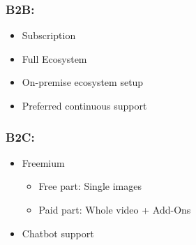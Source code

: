 \subsubsection*{B2B:}
\begin{itemize}
    \item Subscription
    \item Full Ecosystem
    \item On-premise ecosystem setup
    \item Preferred continuous support
\end{itemize}

\subsubsection*{B2C:}
\begin{itemize}
    \item Freemium
    \begin{itemize}
        \item Free part: Single images
        \item Paid part: Whole video + Add-Ons
    \end{itemize}
    \item Chatbot support
\end{itemize}

